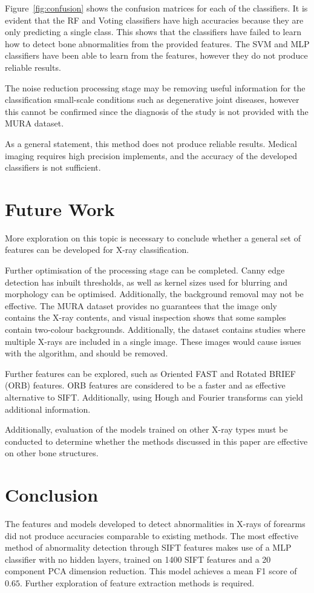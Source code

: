\documentclass{IEEEtran}
\begin{document}
	Figure~\ref{fig:confusion} shows the confusion matrices for each of the classifiers. It is evident that the RF and Voting classifiers have high accuracies because they are only predicting a single class. This shows that the classifiers have failed to learn how to detect bone abnormalities from the provided features. The SVM and MLP classifiers have been able to learn from the features, however they do not produce reliable results. 
	
	The noise reduction processing stage may be removing useful information for the classification small-scale conditions such as degenerative joint diseases, however this cannot be confirmed since the diagnosis of the study is not provided with the MURA dataset. 
	
	As a general statement, this method does not produce reliable results. Medical imaging requires high precision implements, and the accuracy of the developed classifiers is not sufficient. 
	
	\section{Future Work} \label{sec:future}
	
	More exploration on this topic is necessary to conclude whether a general set of features can be developed for X-ray classification. 
	
	Further optimisation of the processing stage can be completed. Canny edge detection has inbuilt thresholds, as well as kernel sizes used for blurring and morphology can be optimised. Additionally, the background removal may not be effective. The MURA dataset provides no guarantees that the image only contains the X-ray contents, and visual inspection shows that some samples contain two-colour backgrounds. Additionally, the dataset contains studies where multiple X-rays are included in a single image. These images would cause issues with the algorithm, and should be removed.
	
	Further features can be explored, such as Oriented FAST and Rotated BRIEF (ORB) features. ORB features are considered to be a faster and as effective alternative to SIFT. Additionally, using Hough and Fourier transforms can yield additional information.
	
	Additionally, evaluation of the models trained on other X-ray types must be conducted to determine whether the methods discussed in this paper are effective on other bone structures.
	
	\section{Conclusion}
	
	The features and models developed to detect abnormalities in X-rays of forearms did not produce accuracies comparable to existing methods. The most effective method of abnormality detection through SIFT features makes use of a MLP classifier with no hidden layers, trained on 1400 SIFT features and a 20 component PCA dimension reduction. This model achieves a mean F1 score of $0.65$. Further exploration of feature extraction methods is required.
	
	\clearpage
	
	
\end{document}
